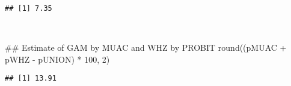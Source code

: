 \documentclass[12pt,a4paper]{article}
\newenvironment{Shaded}{}{}
\newcommand{\CommentTok}[1]{\textcolor[rgb]{0.00,0.50,0.00}{#1}}
\newcommand{\DecValTok}[1]{#1}
\newcommand{\KeywordTok}[1]{\textcolor[rgb]{0.00,0.00,1.00}{#1}}
\newcommand{\NormalTok}[1]{#1}
\newcommand{\OperatorTok}[1]{#1}
\newcommand{\StringTok}[1]{\textcolor[rgb]{0.00,0.50,0.50}{#1}}
\begin{document}
\begin{verbatim}
## [1] 7.35
\end{verbatim}

~

\begin{Shaded}
\begin{Highlighting}[]
\CommentTok{## Estimate of GAM by MUAC and WHZ by PROBIT}
\KeywordTok{round}\NormalTok{((pMUAC }\OperatorTok{+}\StringTok{ }\NormalTok{pWHZ }\OperatorTok{-}\StringTok{ }\NormalTok{pUNION) }\OperatorTok{*}\StringTok{ }\DecValTok{100}\NormalTok{, }\DecValTok{2}\NormalTok{)}
\end{Highlighting}
\end{Shaded}

\begin{verbatim}
## [1] 13.91
\end{verbatim}


\end{document}
